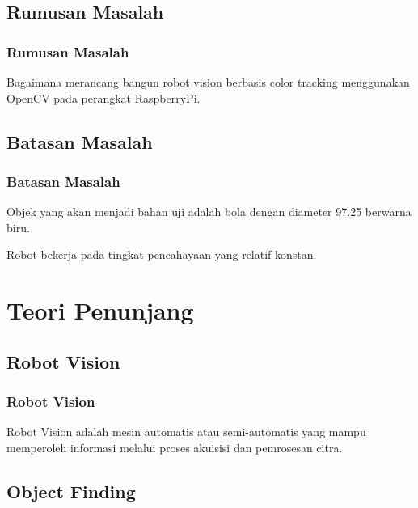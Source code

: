 \documentclass[table,dvipsnames]{beamer}
\begin{document}
\subsection{Rumusan Masalah}

\begin{frame}
\frametitle{Rumusan Masalah}
\begin{block}{}
Bagaimana merancang bangun robot vision berbasis color tracking menggunakan OpenCV pada perangkat RaspberryPi.
\end{block}
\end{frame}

\subsection{Batasan Masalah}

\begin{frame}
\frametitle{Batasan Masalah}
\begin{block}{}
Objek yang akan menjadi bahan uji adalah bola dengan diameter 97.25 berwarna biru.
\end{block}
\begin{block}{}
Robot bekerja pada tingkat pencahayaan yang relatif konstan.
\end{block}
\end{frame}


\section{Teori Penunjang}

\subsection{Robot Vision}

\begin{frame}
\frametitle{Robot Vision}
\begin{block}{\cite{robot_vis}}
 Robot Vision adalah mesin automatis atau semi-automatis yang mampu memperoleh informasi melalui proses akuisisi dan pemrosesan citra.
\end{block}
\end{frame}


\subsection{Object Finding}
\end{document}
